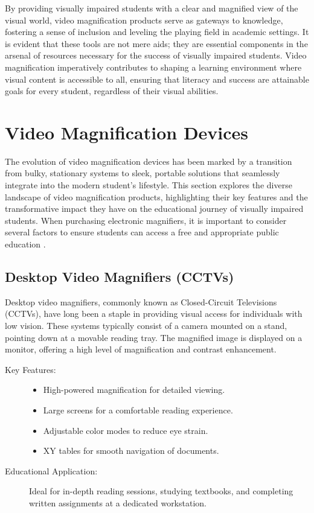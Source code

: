 By providing visually impaired students with a clear and magnified view of the visual world, video magnification products serve as gateways to knowledge, fostering a sense of inclusion and leveling the playing field in academic settings. It is evident that these tools are not mere aids; they are essential components in the arsenal of resources necessary for the success of visually impaired students. Video magnification imperatively contributes to shaping a learning environment where visual content is accessible to all, ensuring that literacy and success are attainable goals for every student, regardless of their visual abilities.\supercite{Kelly2011, Burgstahler2015}

\section{Video Magnification Devices}\label{ch6:sec:video-magnification-devices}
The evolution of video magnification devices has been marked by a transition from bulky, stationary systems to sleek, portable solutions that seamlessly integrate into the modern student's lifestyle. This section explores the diverse landscape of video magnification products, highlighting their key features and the transformative impact they have on the educational journey of visually impaired students. When purchasing electronic magnifiers, it is important to consider several factors to ensure students can access a free and appropriate public education \supercite{PerkinsVideoMagnifier}.

\subsection{Desktop Video Magnifiers (CCTVs)}
Desktop video magnifiers, commonly known as Closed-Circuit Televisions (CCTVs), have long been a staple in providing visual access for individuals with low vision. These systems typically consist of a camera mounted on a stand, pointing down at a movable reading tray. The magnified image is displayed on a monitor, offering a high level of magnification and contrast enhancement.\supercite{AFBMagnification}

\begin{description}
	\item[Key Features:]
	      \begin{itemize}
		      \item High-powered magnification for detailed viewing.
		      \item Large screens for a comfortable reading experience.
		      \item Adjustable color modes to reduce eye strain.
		      \item XY tables for smooth \gls{navigation} of documents.
	      \end{itemize}
	\item[Educational Application:] Ideal for in-depth reading sessions, studying textbooks, and completing written assignments at a dedicated workstation.
\end{description}

